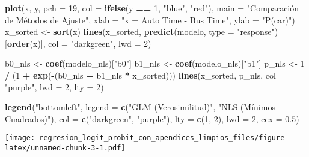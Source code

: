 \documentclass[
]{article}
\newenvironment{Shaded}{\begin{snugshade}}{\end{snugshade}}
\newcommand{\AttributeTok}[1]{\textcolor[rgb]{0.13,0.29,0.53}{#1}}
\newcommand{\DecValTok}[1]{\textcolor[rgb]{0.00,0.00,0.81}{#1}}
\newcommand{\FloatTok}[1]{\textcolor[rgb]{0.00,0.00,0.81}{#1}}
\newcommand{\FunctionTok}[1]{\textcolor[rgb]{0.13,0.29,0.53}{\textbf{#1}}}
\newcommand{\NormalTok}[1]{#1}
\newcommand{\OtherTok}[1]{\textcolor[rgb]{0.56,0.35,0.01}{#1}}
\newcommand{\SpecialCharTok}[1]{\textcolor[rgb]{0.81,0.36,0.00}{\textbf{#1}}}
\newcommand{\StringTok}[1]{\textcolor[rgb]{0.31,0.60,0.02}{#1}}
\begin{document}
\begin{Shaded}
\begin{Highlighting}[]
\FunctionTok{plot}\NormalTok{(x, y, }\AttributeTok{pch =} \DecValTok{19}\NormalTok{, }\AttributeTok{col =} \FunctionTok{ifelse}\NormalTok{(y }\SpecialCharTok{==} \DecValTok{1}\NormalTok{, }\StringTok{"blue"}\NormalTok{, }\StringTok{"red"}\NormalTok{),}
     \AttributeTok{main =} \StringTok{"Comparación de Métodos de Ajuste"}\NormalTok{, }\AttributeTok{xlab =} \StringTok{"x = Auto Time {-} Bus Time"}\NormalTok{, }\AttributeTok{ylab =} \StringTok{"P(car)"}\NormalTok{)}
\NormalTok{x\_sorted }\OtherTok{\textless{}{-}} \FunctionTok{sort}\NormalTok{(x)}
\FunctionTok{lines}\NormalTok{(x\_sorted, }\FunctionTok{predict}\NormalTok{(modelo, }\AttributeTok{type =} \StringTok{"response"}\NormalTok{)[}\FunctionTok{order}\NormalTok{(x)], }\AttributeTok{col =} \StringTok{"darkgreen"}\NormalTok{, }\AttributeTok{lwd =} \DecValTok{2}\NormalTok{)}

\NormalTok{b0\_nls }\OtherTok{\textless{}{-}} \FunctionTok{coef}\NormalTok{(modelo\_nls)[}\StringTok{"b0"}\NormalTok{]}
\NormalTok{b1\_nls }\OtherTok{\textless{}{-}} \FunctionTok{coef}\NormalTok{(modelo\_nls)[}\StringTok{"b1"}\NormalTok{]}
\NormalTok{p\_nls }\OtherTok{\textless{}{-}} \DecValTok{1} \SpecialCharTok{/}\NormalTok{ (}\DecValTok{1} \SpecialCharTok{+} \FunctionTok{exp}\NormalTok{(}\SpecialCharTok{{-}}\NormalTok{(b0\_nls }\SpecialCharTok{+}\NormalTok{ b1\_nls }\SpecialCharTok{*}\NormalTok{ x\_sorted)))}
\FunctionTok{lines}\NormalTok{(x\_sorted, p\_nls, }\AttributeTok{col =} \StringTok{"purple"}\NormalTok{, }\AttributeTok{lwd =} \DecValTok{2}\NormalTok{, }\AttributeTok{lty =} \DecValTok{2}\NormalTok{)}

\FunctionTok{legend}\NormalTok{(}\StringTok{"bottomleft"}\NormalTok{, }\AttributeTok{legend =} \FunctionTok{c}\NormalTok{(}\StringTok{"GLM (Verosimilitud)"}\NormalTok{, }\StringTok{"NLS (Mínimos Cuadrados)"}\NormalTok{),}
       \AttributeTok{col =} \FunctionTok{c}\NormalTok{(}\StringTok{"darkgreen"}\NormalTok{, }\StringTok{"purple"}\NormalTok{), }\AttributeTok{lty =} \FunctionTok{c}\NormalTok{(}\DecValTok{1}\NormalTok{, }\DecValTok{2}\NormalTok{), }\AttributeTok{lwd =} \DecValTok{2}\NormalTok{, }\AttributeTok{cex =} \FloatTok{0.5}\NormalTok{)}
\end{Highlighting}
\end{Shaded}

\texttt{[image: regresion\_logit\_probit\_con\_apendices\_limpios\_files/figure-latex/unnamed-chunk-3-1.pdf]}
\end{document}
